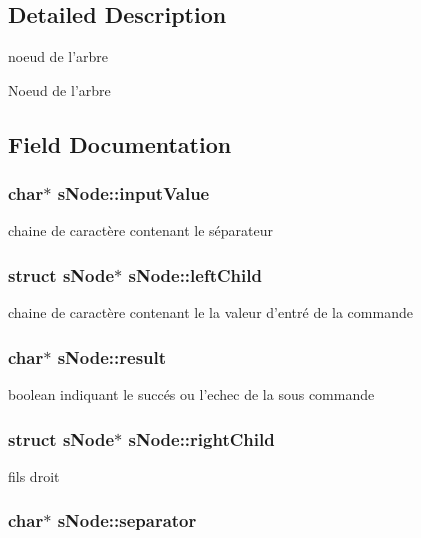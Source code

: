 \subsection{Detailed Description}
noeud de l'arbre 

Noeud de l'arbre 

\subsection{Field Documentation}
\hypertarget{structsNode_acaa42ae913310f65b9d08a4cecb3d40f}{
\subsubsection[{input\-Value}]{\setlength{\rightskip}{0pt plus 5cm}char$\ast$ s\-Node\-::input\-Value}}\label{structsNode_acaa42ae913310f65b9d08a4cecb3d40f}
chaine de caractère contenant le séparateur \hypertarget{structsNode_abf2b6d71454df07a766b315346375dbd}{
\subsubsection[{left\-Child}]{\setlength{\rightskip}{0pt plus 5cm}struct {\bf s\-Node}$\ast$ s\-Node\-::left\-Child}}\label{structsNode_abf2b6d71454df07a766b315346375dbd}
chaine de caractère contenant le la valeur d'entré de la commande \hypertarget{structsNode_af404972110c1a3225dd689b03a931b36}{
\subsubsection[{result}]{\setlength{\rightskip}{0pt plus 5cm}char$\ast$ s\-Node\-::result}}\label{structsNode_af404972110c1a3225dd689b03a931b36}
boolean indiquant le succés ou l'echec de la sous commande \hypertarget{structsNode_ad922ff3aa8dfeea7ca810d6524799126}{
\subsubsection[{right\-Child}]{\setlength{\rightskip}{0pt plus 5cm}struct {\bf s\-Node}$\ast$ s\-Node\-::right\-Child}}\label{structsNode_ad922ff3aa8dfeea7ca810d6524799126}
fils droit \hypertarget{structsNode_a114d95f7bc7d2ba888a7b297703d73dd}{
\subsubsection[{separator}]{\setlength{\rightskip}{0pt plus 5cm}char$\ast$ s\-Node\-::separator}}\label{structsNode_a114d95f7bc7d2ba888a7b297703d73dd}

